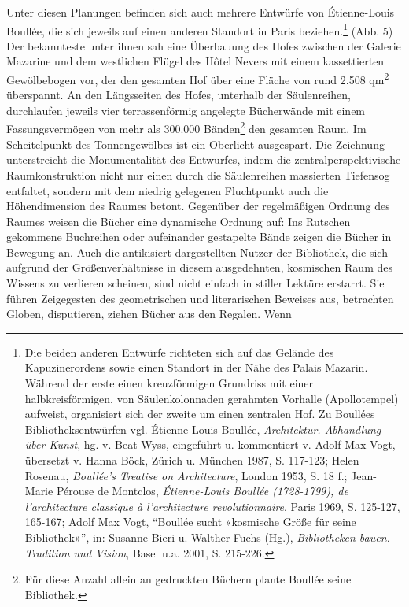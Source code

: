 Unter diesen Planungen befinden sich auch mehrere Entwürfe von
Étienne-Louis Boullée, die sich jeweils auf einen anderen Standort in
Paris beziehen.\footnote{Die beiden anderen Entwürfe richteten sich auf
  das Gelände des Kapuzinerordens sowie einen Standort in der Nähe des
  Palais Mazarin. Während der erste einen kreuzförmigen Grundriss mit
  einer halbkreisförmigen, von Säulenkolonnaden gerahmten Vorhalle
  (Apollotempel) aufweist, organisiert sich der zweite um einen
  zentralen Hof. Zu Boullées Bibliotheksentwürfen vgl. Étienne-Louis
  Boullée, \emph{Architektur. Abhandlung über Kunst}, hg. v. Beat Wyss,
  eingeführt u. kommentiert v. Adolf Max Vogt, übersetzt v. Hanna Böck,
  Zürich u. München 1987, S. 117-123; Helen Rosenau, \emph{Boullée's
  Treatise on Architecture}, London 1953, S. 18 f.; Jean-Marie Pérouse
  de Montclos, \emph{Étienne-Louis Boullée (1728-1799), de
  l'architecture classique à l'architecture revolutionnaire}, Paris
  1969, S. 125-127, 165-167; Adolf Max Vogt, \enquote{Boullée sucht
  «kosmische Größe für seine Bibliothek»}, in: Susanne Bieri u. Walther
  Fuchs (Hg.), \emph{Bibliotheken bauen. Tradition und Vision}, Basel
  u.a. 2001, S. 215-226.} (Abb. 5) Der bekannteste unter ihnen sah eine
Überbauung des Hofes zwischen der Galerie Mazarine und dem westlichen
Flügel des Hôtel Nevers mit einem kassettierten Gewölbebogen vor, der
den gesamten Hof über eine Fläche von rund 2.508 qm\textsuperscript{2}
überspannt. An den Längsseiten des Hofes, unterhalb der Säulenreihen,
durchlaufen jeweils vier terrassenförmig angelegte Bücherwände mit einem
Fassungsvermögen von mehr als 300.000 Bänden\footnote{Für diese Anzahl
  allein an gedruckten Büchern plante Boullée seine Bibliothek.} den
gesamten Raum. Im Scheitelpunkt des Tonnengewölbes ist ein Oberlicht
ausgespart. Die Zeichnung unterstreicht die Monumentalität des
Entwurfes, indem die zentralperspektivische Raumkonstruktion nicht nur
einen durch die Säulenreihen massierten Tiefensog entfaltet, sondern mit
dem niedrig gelegenen Fluchtpunkt auch die Höhendimension des Raumes
betont. Gegenüber der regelmäßigen Ordnung des Raumes weisen die Bücher
eine dynamische Ordnung auf: Ins Rutschen gekommene Buchreihen oder
aufeinander gestapelte Bände zeigen die Bücher in Bewegung an. Auch die
antikisiert dargestellten Nutzer der Bibliothek, die sich aufgrund der
Größenverhältnisse in diesem ausgedehnten, kosmischen Raum des Wissens
zu verlieren scheinen, sind nicht einfach in stiller Lektüre erstarrt.
Sie führen Zeigegesten des geometrischen und literarischen Beweises aus,
betrachten Globen, disputieren, ziehen Bücher aus den Regalen. Wenn
